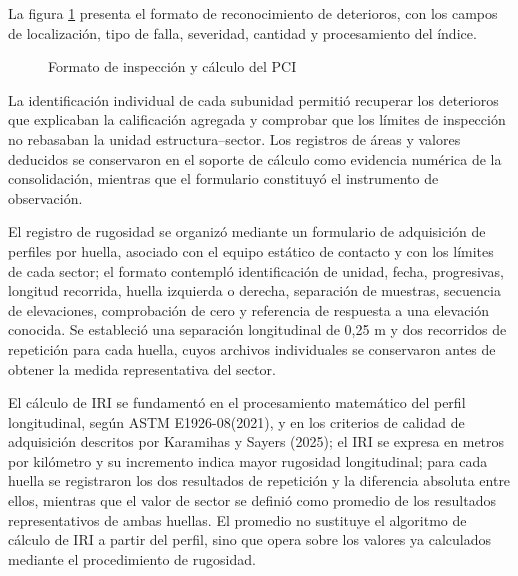 La figura \ref{fig:formato-pci} presenta el formato de reconocimiento de deterioros, con los campos de localización, tipo de falla, severidad, cantidad y procesamiento del índice.

\begin{figure}[p]
\centering
\caption{Formato de inspección y cálculo del PCI}
\label{fig:formato-pci}
\begin{minipage}{0.95\linewidth}

\end{minipage}
\end{figure}

La identificación individual de cada subunidad permitió recuperar los deterioros que explicaban la calificación agregada y comprobar que los límites de inspección no rebasaban la unidad estructura–sector. Los registros de áreas y valores deducidos se conservaron en el soporte de cálculo como evidencia numérica de la consolidación, mientras que el formulario constituyó el instrumento de observación.


El registro de rugosidad se organizó mediante un formulario de adquisición de perfiles por huella, asociado con el equipo estático de contacto y con los límites de cada sector; el formato contempló identificación de unidad, fecha, progresivas, longitud recorrida, huella izquierda o derecha, separación de muestras, secuencia de elevaciones, comprobación de cero y referencia de respuesta a una elevación conocida. Se estableció una separación longitudinal de 0,25 m y dos recorridos de repetición para cada huella, cuyos archivos individuales se conservaron antes de obtener la medida representativa del sector.

El cálculo de IRI se fundamentó en el procesamiento matemático del perfil longitudinal, según ASTM E1926-08(2021), y en los criterios de calidad de adquisición descritos por Karamihas y Sayers (2025); el IRI se expresa en metros por kilómetro y su incremento indica mayor rugosidad longitudinal; para cada huella se registraron los dos resultados de repetición y la diferencia absoluta entre ellos, mientras que el valor de sector se definió como promedio de los resultados representativos de ambas huellas. El promedio no sustituye el algoritmo de cálculo de IRI a partir del perfil, sino que opera sobre los valores ya calculados mediante el procedimiento de rugosidad.

